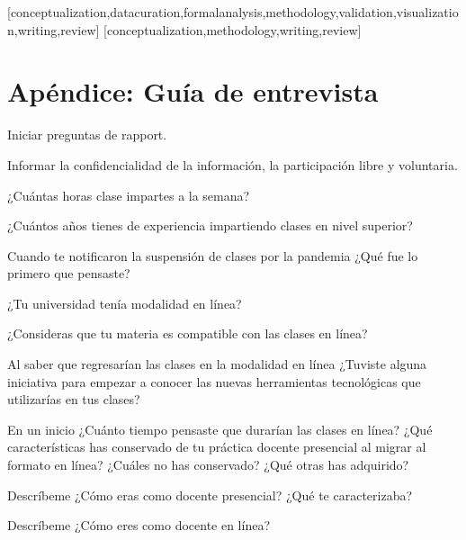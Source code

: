 \documentclass[spanish]{textolivre}
\begin{document}
\printbibliography\label{sec-bib}


\begin{contributors}
[conceptualization,datacuration,formalanalysis,methodology,validation,visualization,writing,review]
[conceptualization,methodology,writing,review]
\end{contributors}

\appendix
\section{Apéndice: Guía de entrevista}\label{Anexo}

Iniciar preguntas de rapport. 

Informar la confidencialidad de la información, la participación libre y voluntaria.

¿Cuántas horas clase impartes a la semana?

¿Cuántos años tienes de experiencia impartiendo clases en nivel superior?

Cuando te notificaron la suspensión de clases por la pandemia ¿Qué fue lo primero que pensaste?

¿Tu universidad tenía modalidad en línea?

¿Consideras que tu materia es compatible con las clases en línea?

Al saber que regresarían las clases en la modalidad en línea ¿Tuviste alguna iniciativa para empezar a conocer las nuevas herramientas tecnológicas que utilizarías en tus clases?

En un inicio ¿Cuánto tiempo pensaste que durarían las clases en línea?
¿Qué características has conservado de tu práctica docente presencial al migrar al formato en línea? ¿Cuáles no has conservado? ¿Qué otras has adquirido?

Descríbeme ¿Cómo eras como docente presencial? ¿Qué te caracterizaba?

Descríbeme ¿Cómo eres como docente en línea?
\end{document}
